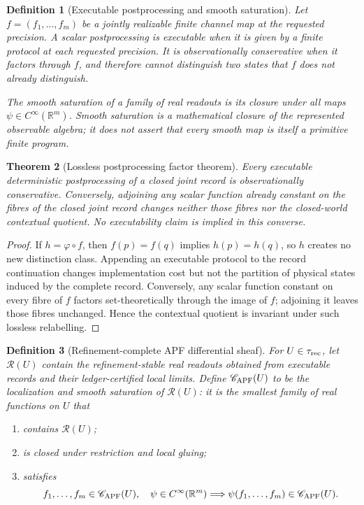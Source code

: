 \documentclass[11pt]{article}
\newtheorem{theorem}{Theorem}[section]
\newtheorem{definition}[theorem]{Definition}
\theoremstyle{remark}
\begin{document}
\begin{definition}[Executable postprocessing and smooth saturation]
\label{def:executable-vs-saturated}
Let $f=(f_1,\ldots,f_m)$ be a jointly realizable finite channel map at the requested precision.  A scalar
postprocessing is \emph{executable} when it is given by a finite protocol at
each requested precision.  It is \emph{observationally conservative} when it
factors through $f$, and therefore cannot distinguish two states that $f$
does not already distinguish.

The \emph{smooth saturation} of a family of real readouts is its closure under
all maps $\psi\in C^\infty(\mathbb R^m)$.  Smooth saturation is a mathematical
closure of the represented observable algebra; it does not assert that every
smooth map is itself a primitive finite program.
\end{definition}

\begin{theorem}[Lossless postprocessing factor theorem]
\label{thm:lossless-postprocessing-factor}
Every executable deterministic postprocessing of a closed joint record is
observationally conservative.  Conversely, adjoining any scalar function already constant on the fibres of the closed joint record changes neither those fibres nor the closed-world contextual quotient.  No executability claim is implied in this converse.
\end{theorem}

\begin{proof}
If $h=\varphi\circ f$, then $f(p)=f(q)$ implies $h(p)=h(q)$, so $h$ creates no
new distinction class.  Appending an executable protocol to the record
continuation changes implementation cost but not the partition of physical
states induced by the complete record.  Conversely, any scalar function
constant on every fibre of $f$ factors set-theoretically through the image of
$f$; adjoining it leaves those fibres unchanged.  Hence the contextual
quotient is invariant under such lossless relabelling.
\end{proof}

\begin{definition}[Refinement-complete APF differential sheaf]
\label{def:record-sheaf}
For $U\in\tau_{\rm rec}$, let $\mathscr R(U)$ contain the refinement-stable
real readouts obtained from executable records and their ledger-certified
local limits.  Define $\mathscr C_{\rm APF}(U)$ to be the localization and
smooth saturation of $\mathscr R(U)$: it is the smallest family of real
functions on $U$ that
\begin{enumerate}[label=(\roman*)]
\item contains $\mathscr R(U)$;
\item is closed under restriction and local gluing;
\item satisfies
\[
f_1,\ldots,f_m\in\mathscr C_{\rm APF}(U),\quad
\psi\in C^\infty(\mathbb R^m)
\Longrightarrow
\psi(f_1,\ldots,f_m)\in\mathscr C_{\rm APF}(U).
\]
\end{enumerate}
\end{definition}
\end{document}
